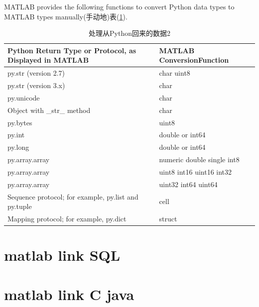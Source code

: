             MATLAB provides the following functions to convert Python data types to MATLAB types manually(手动地)表(\ref{处理从Python回来的数据2}).
            \begin{table}[H]
              \centering
              \caption{处理从Python回来的数据2}
              \label{处理从Python回来的数据2}
              \begin{tabularx}{\textwidth}{l|l}%
              \toprule
              Python Return Type or Protocol, as Displayed in MATLAB& MATLAB ConversionFunction \\
              \midrule
              py.str (version 2.7) & char uint8\\
              py.str (version 3.x) & char\\
              py.unicode & char\\
              Object with \_str\_ method & char\\
              py.bytes & uint8\\
              py.int & double or int64\\
              py.long& double or int64\\
              py.array.array& numeric double single int8\\
              py.array.array& uint8 int16 uint16 int32\\
              py.array.array& uint32 int64 uint64\\
              Sequence protocol; for example, py.list and py.tuple & cell\\
              Mapping protocol; for example, py.dict & struct\\
              \bottomrule
              \end{tabularx}
            \end{table}

\section{matlab link SQL}

\section{matlab link C java }

% 
